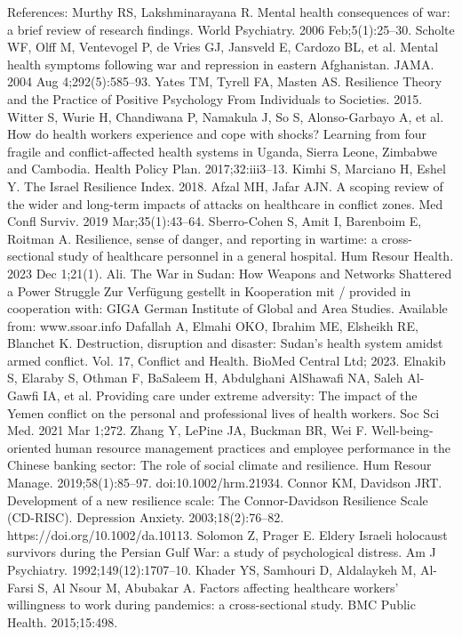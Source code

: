 References:
Murthy RS, Lakshminarayana R. Mental health consequences of war: a brief review of research findings. World Psychiatry. 2006 Feb;5(1):25–30. 
Scholte WF, Olff M, Ventevogel P, de Vries GJ, Jansveld E, Cardozo BL, et al. Mental health symptoms following war and repression in eastern Afghanistan. JAMA. 2004 Aug 4;292(5):585–93. 
Yates TM, Tyrell FA, Masten AS. Resilience Theory and the Practice of Positive Psychology From Individuals to Societies. 2015. 
Witter S, Wurie H, Chandiwana P, Namakula J, So S, Alonso-Garbayo A, et al. How do health workers experience and cope with shocks? Learning from four fragile and conflict-affected health systems in Uganda, Sierra Leone, Zimbabwe and Cambodia. Health Policy Plan. 2017;32:iii3–13. 
Kimhi S, Marciano H, Eshel Y. The Israel Resilience Index. 2018. 
Afzal MH, Jafar AJN. A scoping review of the wider and long-term impacts of attacks on healthcare in conflict zones. Med Confl Surviv. 2019 Mar;35(1):43–64. 
Sberro-Cohen S, Amit I, Barenboim E, Roitman A. Resilience, sense of danger, and reporting in wartime: a cross-sectional study of healthcare personnel in a general hospital. Hum Resour Health. 2023 Dec 1;21(1). 
Ali. The War in Sudan: How Weapons and Networks Shattered a Power Struggle Zur Verfügung gestellt in Kooperation mit / provided in cooperation with: GIGA German Institute of Global and Area Studies. Available from: www.ssoar.info
Dafallah A, Elmahi OKO, Ibrahim ME, Elsheikh RE, Blanchet K. Destruction, disruption and disaster: Sudan’s health system amidst armed conflict. Vol. 17, Conflict and Health. BioMed Central Ltd; 2023. 
Elnakib S, Elaraby S, Othman F, BaSaleem H, Abdulghani AlShawafi NA, Saleh Al-Gawfi IA, et al. Providing care under extreme adversity: The impact of the Yemen conflict on the personal and professional lives of health workers. Soc Sci Med. 2021 Mar 1;272. 
Zhang Y, LePine JA, Buckman BR, Wei F. Well-being-oriented human resource management practices and employee performance in the Chinese banking sector: The role of social climate and resilience. Hum Resour Manage. 2019;58(1):85–97. doi:10.1002/hrm.21934.
Connor KM, Davidson JRT. Development of a new resilience scale: The Connor-Davidson Resilience Scale (CD-RISC). Depression Anxiety. 2003;18(2):76–82. https://doi.org/10.1002/da.10113.
Solomon Z, Prager E. Eldery Israeli holocaust survivors during the Persian Gulf War: a study of psychological distress. Am J Psychiatry. 1992;149(12):1707–10.
Khader YS, Samhouri D, Aldalaykeh M, Al-Farsi S, Al Nsour M, Abubakar A. Factors affecting healthcare workers’ willingness to work during pandemics: a cross-sectional study. BMC Public Health. 2015;15:498.
